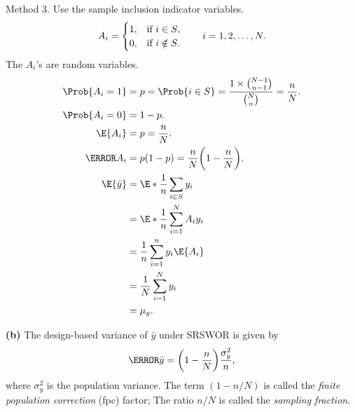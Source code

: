 Method 3. Use the sample inclusion indicator variables.
\[ A_i=\begin{cases}
            1, & \text{if $ i\in S $},    \\
            0, & \text{if $ i\notin S $}.
      \end{cases}\qquad i=1,2,\ldots,N. \]
The $ A_i $'s are random variables.
\begin{align*}
      \Prob{A_i=1} & =p=\Prob{i\in S}=\frac{1\times \binom{N-1}{n-1}}{\binom{N}{n}}=\frac{n}{N}. \\
      \Prob{A_i=0} & =1-p.                                                                       \\
      \E{A_i}      & =p=\frac{n}{N}.                                                             \\
      \V{A_i}      & =p(1-p)=\frac{n}{N}\biggl(1-\frac{n}{N}\biggr).                             \\
      \E{\bar{y}}  & =\E*{\frac{1}{n}\sum_{i\in S}y_i}                                           \\
                   & =\E*{\frac{1}{n}\sum_{i=1}^{N}A_i y_i}                                      \\
                   & =\frac{1}{n}\sum_{i=1}^{n}y_i\E{A_i}                                        \\
                   & =\frac{1}{N}\sum_{i=1}^{N}y_i                                               \\
                   & =\mu_y.
\end{align*}

\textbf{(b)} The design-based variance of $ \bar{y} $
under SRSWOR is given by
\[ \V{\bar{y}}=\biggl(1-\frac{n}{N}\biggr)\frac{\sigma_y^2}{n}, \]
where $ \sigma_y^2 $ is the population variance. The term
$ (1-n/N) $ is called the \emph{finite population correction} (fpc)
factor; The ratio $ n/N $ is called the \emph{sampling fraction}.

